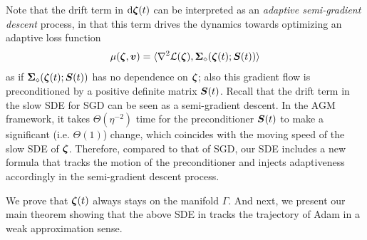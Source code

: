 
Note that the drift term in $\mathrm{d} {\bm{\zeta}}(t)$ can be interpreted as an \textit{adaptive semi-gradient descent} process, in that this term drives the dynamics towards optimizing an adaptive loss function \begin{align*}
    \mu({\bm{\zeta}}, {\bm{v}}) = \langle \nabla^2 \mathcal{L}({\bm{\zeta}}), {\bm{\Sigma}}_{\diamond}({\bm{\zeta}}(t); {\bm{S}}(t))\rangle
\end{align*}
as if ${\bm{\Sigma}}_{\diamond}({\bm{\zeta}}(t); {\bm{S}}(t))$ has no dependence on ${\bm{\zeta}}$; also this gradient flow is preconditioned by a positive definite matrix ${\bm{S}}(t)$. Recall that the drift term in the slow SDE for SGD can be seen as a semi-gradient descent. In the AGM framework, it takes $\Theta(\eta^{-2})$ time for the preconditioner ${\bm{S}}(t)$ to make a significant (i.e. $\Theta(1)$) change, which coincides with the moving speed of the slow SDE of ${\bm{\zeta}}$. Therefore, compared to that of SGD, our SDE includes a new formula that tracks the motion of the preconditioner and injects adaptiveness accordingly in the semi-gradient descent process.

We prove that ${\bm{\zeta}}(t)$ always stays on the manifold $\Gamma$. And next, we present our main theorem showing that the above SDE in  tracks the trajectory of Adam in a weak approximation sense.





    

